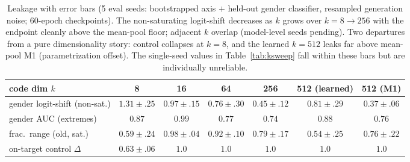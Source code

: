 \documentclass[11pt]{article}
\begin{document}
\begin{table}[h]\centering\small
\begin{tabular}{l cccccc}
code dim $k$ & 8 & 16 & 64 & 256 & 512 (learned) & 512 (M1) \\
\hline
gender logit-shift (non-sat.) & $1.31\!\pm\!.25$ & $0.97\!\pm\!.15$ & $0.76\!\pm\!.30$ & $0.45\!\pm\!.12$ & $0.81\!\pm\!.29$ & $0.37\!\pm\!.06$ \\
gender AUC (extremes)         & $0.87$ & $0.99$ & $0.77$ & $0.74$ & $0.88$ & $0.76$ \\
frac.\ range (old, sat.)      & $0.59\!\pm\!.24$ & $0.98\!\pm\!.04$ & $0.92\!\pm\!.10$ & $0.79\!\pm\!.17$ & $0.54\!\pm\!.25$ & $0.76\!\pm\!.22$ \\
on-target control $\Delta$    & $\mathbf{0.63\!\pm\!.06}$ & $1.0$ & $1.0$ & $1.0$ & $1.0$ & $1.0$ \\
\end{tabular}
\caption{Leakage with error bars (5 eval seeds: bootstrapped axis $+$ held-out
gender classifier, resampled generation noise; 60-epoch checkpoints). The
non-saturating logit-shift decreases as $k$ grows over $k{=}8\!\to\!256$ with the
endpoint cleanly above the mean-pool floor; adjacent $k$ overlap (model-level seeds
pending). Two departures from a pure dimensionality story: control collapses at
$k{=}8$, and the learned $k{=}512$ leaks far above mean-pool M1 (parametrization
offset). The single-seed values in Table~\ref{tab:ksweep} fall within these bars
but are individually unreliable.}
\label{tab:leakrobust}
\end{table}
\end{document}
